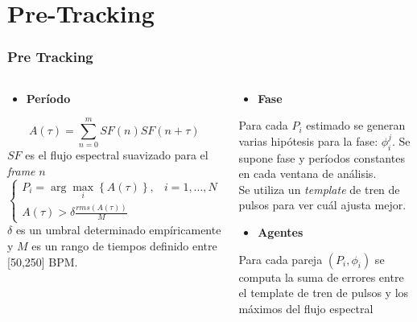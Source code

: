 \documentclass[slidestop,compress,mathserif,xcolor=svgnames,table]{beamer}
\begin{document}
\section{Pre-Tracking}
\begin{frame}
\frametitle{Pre Tracking}

\begin{columns}
\column{2in}
\vspace*{15pt}
\begin{scriptsize}
	\begin{itemize} \item \textbf{Período} \end{itemize}
	\begin{equation*}
		A(\tau) = \sum\limits_{n=0}^{m}SF(n)SF(n+\tau)
		\label{ec:autocorrelacion}
	\end{equation*}
	$SF$ es el flujo espectral suavizado para el \emph{frame} $n$
	\begin{equation*}
		\begin{cases}
		P_i = \arg\max_i \left\{ A(\tau) \right\}, & i=1,\dots, N\\
		A(\tau)>\delta \frac{rms(A(\tau))}{M} & 
		\end{cases}
		\label{ec:period}
	\end{equation*}
$\delta$ es un umbral determinado empíricamente y $M$ es un rango de tiempos definido entre [50,250] BPM.
\end{scriptsize}
\pause

\column{2in}
\vspace*{15pt}
\begin{scriptsize}
\begin{itemize} \item \textbf{Fase} \end{itemize}
Para cada $P_i$ estimado se generan varias hipótesis para la fase: $\phi_i^j$. Se supone fase y períodos constantes en cada ventana de análisis.\\

Se utiliza un \emph{template} de tren de pulsos para ver cuál ajusta mejor.\\[.5cm]
\pause
\begin{itemize} \item \textbf{Agentes} \end{itemize}
Para cada pareja $(P_i,\phi_i)$ se computa la suma de errores entre el template de tren de pulsos y los máximos del flujo espectral

\end{scriptsize}
\end{columns}

\end{frame}
\end{document}
